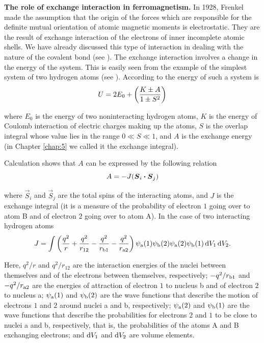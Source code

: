 \textbf{The role of exchange interaction in ferromagnetism.} In 1928, Frenkel made the assumption that the origin of the forces which are responsible for the definite mutual orientation of atomic magnetic moments is electrostatic. They are the result of exchange interaction of the electrons of inner incomplete atomic shells. We have already discussed this type of interaction in dealing with the nature of the covalent bond (see ). The exchange interaction involves a change in the energy of the system. This is easily seen from the example of the simplest system of two hydrogen atoms (see ). According to  the energy of such a system is
\begin{equation}\label{eq:7_70}
    U = 2 E_0 + \left(\frac{K \pm A}{1 \pm S^2}\right)
\end{equation}

\noindent
where $E_0$ is the energy of two noninteracting hydrogen atoms, $K$ is the energy of Coulomb interaction of electric charges making up the atoms, $S$ is the overlap integral whose value lies in the range $0\ll S\ll 1$, and $A$ is the exchange energy (in Chapter \ref{chap:5} we called it the exchange integral).

Calculation shows that $A$ can be expressed by the following relation
\begin{equation}\label{eq:7_71}
    A = - J (\boldsymbol{S}_{i}\boldsymbol{\cdot}\boldsymbol{S}_{j})
\end{equation}

\noindent
where $\vec{S}_i$ and $\vec{S}_j$ are the total spins of the interacting atoms, and $J$ is the exchange integral (it is a measure of the probability of electron $1$ going over to atom B and of electron $2$ going over to atom A). In the case of two interacting hydrogen atoms
\vspace{-10pt}
\begin{equation}\label{eq:7_72}
    J = \int \left(\frac{q^2}{r} + \frac{q^2}{r_{12}} - \frac{q^2}{r_{\text{b$1$}}} -\frac{q^2}{r_{\text{a$2$}}}\right) \psi_{\text{a}}(1) \psi_{\text{b}}(2) \psi_{\text{a}}(2) \psi_{\text{b}}(1)\, \mathrm{d} V_1\, \mathrm{d} V_2.
\end{equation}

\noindent
Here, $q^2/r$ and $q^2/r_{12}$ are the interaction energies of the nuclei between themselves and of the electrons between themselves, respectively; $-q^2/r_{\text{b1}}$ and $-q^2/r_{\text{a2}}$ are the energies of attraction of electron $1$ to nucleus b and of electron $2$ to nucleus a; $\psi_{\text{a}}(1)$ and $\psi_{\text{b}}(2)$ are the wave functions that describe the motion of electrons $1$ and $2$ around nuclei a and b, respectively; $\psi_{\text{a}}(2)$ and $\psi_{\text{b}}(1)$ are the wave functions that describe the probabilities for electrons $2$ and $1$ to be close to nuclei a and b, respectively, that is, the probabilities of the atoms A and B exchanging electrons; and $\mathrm{d} V_1$ and $\mathrm{d} V_2$ are volume elements.

